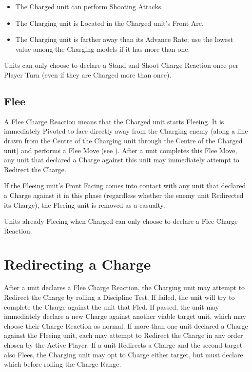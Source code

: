 \begin{itemize}
\item The Charged unit can perform Shooting Attacks.
\item The Charging unit is Located in the Charged unit's Front Arc.
\item The Charging unit is farther away than its Advance Rate; use the lowest value among the Charging models if it has more than one.
 \end{itemize}

Units can only choose to declare a Stand and Shoot Charge Reaction once per Player Turn (even if they are Charged more than once).

\subsection{Flee}

A Flee Charge Reaction means that the Charged unit starts Fleeing. It is immediately Pivoted to face directly away from the Charging enemy (along a line drawn from the Centre of the Charging unit through the Centre of the Charged unit) and performs a Flee Move (see ). After a unit completes this Flee Move, any unit that declared a Charge against this unit may immediately attempt to Redirect the Charge.

If the Fleeing unit's Front Facing comes into contact with any unit that declared a Charge against it in this phase (regardless whether the enemy unit Redirected its Charge), the Fleeing unit is removed as a casualty.

Units already Fleeing when Charged can only choose to declare a Flee Charge Reaction.

\newpage
\section{Redirecting a Charge}

After a unit declares a Flee Charge Reaction, the Charging unit may attempt to Redirect the Charge by rolling a Discipline Test. If failed, the unit will try to complete the Charge against the unit that Fled. If passed, the unit may immediately declare a new Charge against another viable target unit, which may choose their Charge Reaction as normal. If more than one unit declared a Charge against the Fleeing unit, each may attempt to Redirect the Charge in any order chosen by the Active Player. If a unit Redirects a Charge and the second target also Flees, the Charging unit may opt to Charge either target, but must declare which before rolling the Charge Range.

